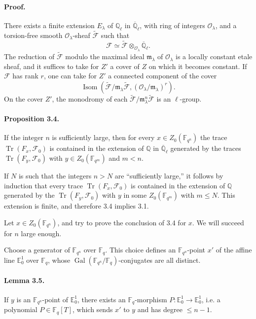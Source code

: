 \documentclass[11pt]{article}
\newcommand{\F}{\mathbb{F}}
\newcommand{\Q}{\mathbb{Q}}
\newcommand{\Ql}{\overline{\mathbb Q}_{\ell}}
\newcommand{\Tr}{\operatorname{Tr}}
\newcommand{\Gal}{\operatorname{Gal}}
\newcommand{\Isom}{\operatorname{Isom}}
\begin{document}
\paragraph{Proof.}
There exists a finite extension $E_\lambda$ of $\mathbb Q_\ell$ in $\Ql$, with ring of integers $\mathcal O_\lambda$, and a torsion-free smooth $\mathcal O_\lambda$-sheaf $\widetilde{\mathcal F}$ such that
\[
 \mathcal F\simeq \widetilde{\mathcal F}\otimes_{\mathcal O_\lambda}\Ql.
\]
The reduction of $\widetilde{\mathcal F}$ modulo the maximal ideal $\mathfrak m_\lambda$ of $\mathcal O_\lambda$ is a locally constant etale sheaf, and it suffices to take for $Z'$ a cover of $Z$ on which it becomes constant.
If $\mathcal F$ has rank $r$, one can take for $Z'$ a connected component of the cover
\[
 \Isom\left(\widetilde{\mathcal F}/\mathfrak m_\lambda\widetilde{\mathcal F},(\mathcal O_\lambda/\mathfrak m_\lambda)^r\right).
\]
On the cover $Z'$, the monodromy of each $\widetilde{\mathcal F}/\mathfrak m_\lambda^n\widetilde{\mathcal F}$ is an $\ell$-group.

\paragraph{Proposition 3.4.}
If the integer $n$ is sufficiently large, then for every $x\in Z_0(\F_{q^n})$ the trace $\Tr(F_x,\mathcal F_0)$ is contained in the extension of $\Q$ in $\Ql$ generated by the traces $\Tr(F_y,\mathcal F_0)$ with $y\in Z_0(\F_{q^m})$ and $m<n$.

If $N$ is such that the integers $n>N$ are ``sufficiently large,'' it follows by induction that every trace $\Tr(F_x,\mathcal F_0)$ is contained in the extension of $\Q$ generated by the $\Tr(F_y,\mathcal F_0)$ with $y$ in some $Z_0(\F_{q^m})$ with $m\le N$.
This extension is finite, and therefore 3.4 implies 3.1.

Let $x\in Z_0(\F_{q^n})$, and try to prove the conclusion of 3.4 for $x$.
We will succeed for $n$ large enough.

Choose a generator of $\F_{q^n}$ over $\F_q$.
This choice defines an $\F_{q^n}$-point $x'$ of the affine line $\mathbb E^1_0$ over $\F_q$, whose $\Gal(\F_{q^n}/\F_q)$-conjugates are all distinct.

\paragraph{Lemma 3.5.}
If $y$ is an $\F_{q^n}$-point of $\mathbb E^1_0$, there exists an $\F_q$-morphism $P:\mathbb E^1_0\to\mathbb E^1_0$, i.e. a polynomial $P\in\F_q[T]$, which sends $x'$ to $y$ and has degree $\le n-1$.
\end{document}
